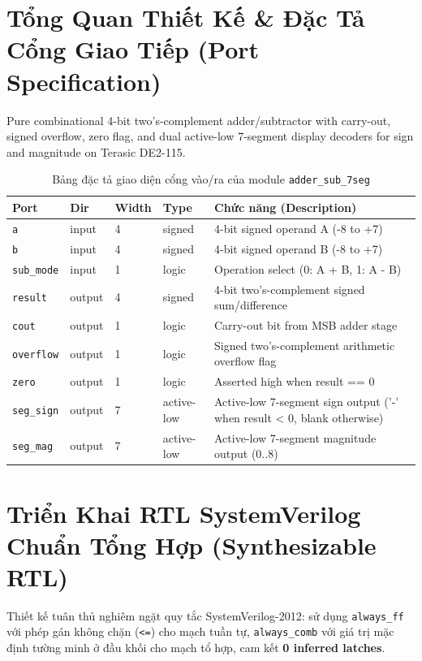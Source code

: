 \documentclass[11pt,a4paper]{article}
\begin{document}
\section{Tổng Quan Thiết Kế \& Đặc Tả Cổng Giao Tiếp (Port Specification)}
Pure combinational 4-bit two's-complement adder/subtractor with carry-out, signed overflow, zero flag, and dual active-low 7-segment display decoders for sign and magnitude on Terasic DE2-115.

\begin{table}[H]
    \centering
    \small
    \caption{Bảng đặc tả giao diện cổng vào/ra của module \texttt{adder\_sub\_7seg}}
    \begin{tabularx}{\textwidth}{@{}llllX@{}}
        \toprule
        \textbf{Port} & \textbf{Dir} & \textbf{Width} & \textbf{Type} & \textbf{Chức năng (Description)} \\
        \midrule
        \texttt{a} & input & 4 & signed & 4-bit signed operand A (-8 to +7) \\
        \texttt{b} & input & 4 & signed & 4-bit signed operand B (-8 to +7) \\
        \texttt{sub\_mode} & input & 1 & logic & Operation select (0: A + B, 1: A - B) \\
        \texttt{result} & output & 4 & signed & 4-bit two's-complement signed sum/difference \\
        \texttt{cout} & output & 1 & logic & Carry-out bit from MSB adder stage \\
        \texttt{overflow} & output & 1 & logic & Signed two's-complement arithmetic overflow flag \\
        \texttt{zero} & output & 1 & logic & Asserted high when result == 0 \\
        \texttt{seg\_sign} & output & 7 & active-low & Active-low 7-segment sign output ('-' when result < 0, blank otherwise) \\
        \texttt{seg\_mag} & output & 7 & active-low & Active-low 7-segment magnitude output (0..8) \\
        \bottomrule
    \end{tabularx}
\end{table}



\section{Triển Khai RTL SystemVerilog Chuẩn Tổng Hợp (Synthesizable RTL)}
Thiết kế tuân thủ nghiêm ngặt quy tắc SystemVerilog-2012: sử dụng \texttt{always\_ff} với phép gán không chặn (\texttt{<=}) cho mạch tuần tự, \texttt{always\_comb} với giá trị mặc định tường minh ở đầu khối cho mạch tổ hợp, cam kết \textbf{0 inferred latches}.
\end{document}
